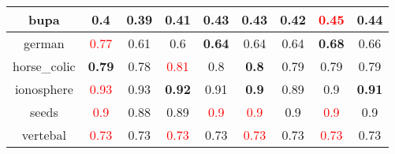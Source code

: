 \documentclass{article}%
\begin{document}
\begin{tabular}{c|cccccccc}
\hline%
bupa&\textbf{0.4}&0.39&0.41&\textbf{0.43}&\textbf{0.43}&0.42&\textcolor{red}{ 
0.45
}&0.44\\%
\hline%
german&\textcolor{red}{ 
0.77
}&0.61&0.6&\textbf{0.64}&0.64&0.64&\textbf{0.68}&0.66\\%
\hline%
horse\_colic&\textbf{0.79}&0.78&\textcolor{red}{ 
0.81
}&0.8&\textbf{0.8}&0.79&0.79&0.79\\%
\hline%
ionosphere&\textcolor{red}{ 
0.93
}&0.93&\textbf{0.92}&0.91&\textbf{0.9}&0.89&0.9&\textbf{0.91}\\%
\hline%
seeds&\textcolor{red}{ 
0.9
}&0.88&0.89&\textcolor{red}{ 
0.9
}&\textcolor{red}{ 
0.9
}&0.9&\textcolor{red}{ 
0.9
}&0.9\\%
\hline%
vertebal&\textcolor{red}{ 
0.73
}&0.73&\textcolor{red}{ 
0.73
}&0.73&\textcolor{red}{ 
0.73
}&0.73&\textcolor{red}{ 
0.73
}&0.73\\%
\hline%
\end{tabular}

%
\end{document}
